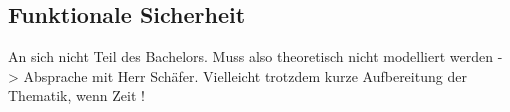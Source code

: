 \documentclass[../../../Bachelorarbeit.tex]{subfiles}
\begin{document}
\subsection{Funktionale Sicherheit}
\color{red}
An sich nicht Teil des Bachelors. Muss also theoretisch nicht modelliert werden -> Absprache mit Herr Schäfer. Vielleicht trotzdem kurze Aufbereitung der Thematik, wenn Zeit !
\end{document}

